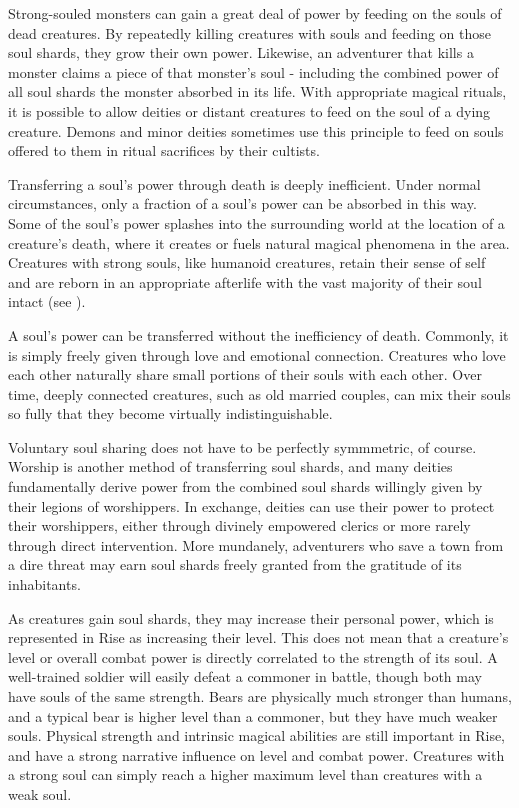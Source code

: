         Strong-souled monsters can gain a great deal of power by feeding on the souls of dead creatures.
        By repeatedly killing creatures with souls and feeding on those soul shards, they grow their own power.
        Likewise, an adventurer that kills a monster claims a piece of that monster's soul - including the combined power of all soul shards the monster absorbed in its life.
        With appropriate magical rituals, it is possible to allow deities or distant creatures to feed on the soul of a dying creature.
        Demons and minor deities sometimes use this principle to feed on souls offered to them in ritual sacrifices by their cultists.

        Transferring a soul's power through death is deeply inefficient.
        Under normal circumstances, only a fraction of a soul's power can be absorbed in this way.
        Some of the soul's power splashes into the surrounding world at the location of a creature's death, where it creates or fuels natural magical phenomena in the area.
        Creatures with strong souls, like humanoid creatures, retain their sense of self and are reborn in an appropriate afterlife with the vast majority of their soul intact (see ).

        A soul's power can be transferred without the inefficiency of death.
        Commonly, it is simply freely given through love and emotional connection.
        Creatures who love each other naturally share small portions of their souls with each other.
        Over time, deeply connected creatures, such as old married couples, can mix their souls so fully that they become virtually indistinguishable.

        Voluntary soul sharing does not have to be perfectly symmmetric, of course.
        Worship is another method of transferring soul shards, and many deities fundamentally derive power from the combined soul shards willingly given by their legions of worshippers.
        In exchange, deities can use their power to protect their worshippers, either through divinely empowered clerics or more rarely through direct intervention.
        More mundanely, adventurers who save a town from a dire threat may earn soul shards freely granted from the gratitude of its inhabitants.

        As creatures gain soul shards, they may increase their personal power, which is represented in Rise as increasing their level.
        This does not mean that a creature's level or overall combat power is directly correlated to the strength of its soul.
        A well-trained soldier will easily defeat a commoner in battle, though both may have souls of the same strength.
        Bears are physically much stronger than humans, and a typical bear is higher level than a commoner, but they have much weaker souls.
        Physical strength and intrinsic magical abilities are still important in Rise, and have a strong narrative influence on level and combat power.
        Creatures with a strong soul can simply reach a higher maximum level than creatures with a weak soul.

